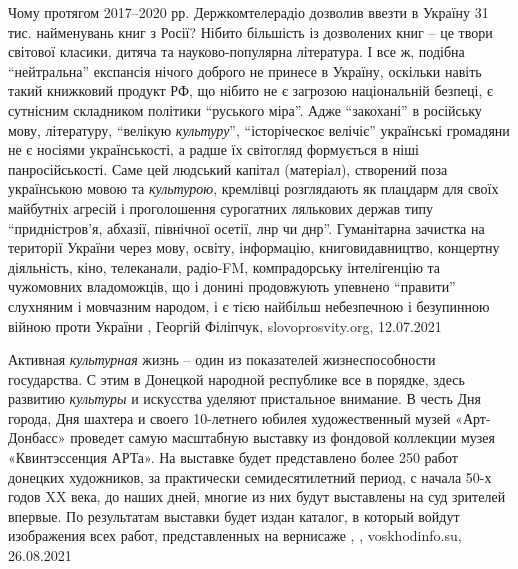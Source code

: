 Чому протягом 2017–2020 рр. Держкомтелерадіо дозволив ввезти в Україну 31 тис.
найменувань книг з Росії? Нібито більшість із дозволених книг – це твори
світової класики, дитяча та науково-популярна література. І все ж, подібна
\enquote{нейтральна} експансія нічого доброго не принесе в Україну, оскільки навіть
такий книжковий продукт РФ, що нібито не є загрозою національній безпеці, є
сутнісним складником політики \enquote{руського міра}. Адже \enquote{закохані} в російську
мову, літературу, \enquote{велікую \emph{культуру}}, \enquote{історіческоє велічіє} українські
громадяни не є носіями українськості, а радше їх світогляд формується в ніші
панросійськості. Саме цей людський капітал (матеріал), створений поза
українською мовою та \emph{культурою}, кремлівці розглядають як плацдарм для своїх
майбутніх агресій і проголошення сурогатних лялькових держав типу
\enquote{придністров’я, абхазії, північної осетії, лнр чи днр}. Гуманітарна зачистка на
території України через мову, освіту, інформацію, книговидавництво, концертну
діяльність, кіно, телеканали, радіо-FM, компрадорську інтелігенцію та
чужомовних владоможців, що і донині продовжують упевнено \enquote{правити} слухняним і
мовчазним народом, і є тією найбільш небезпечною і безупинною війною проти
України
, Георгій Філіпчук, slovoprosvity.org, 12.07.2021

Активная \emph{культурная} жизнь – один из показателей жизнеспособности
государства. С этим в Донецкой народной республике все в порядке, здесь
развитию \emph{культуры} и искусства уделяют пристальное внимание.  В честь Дня
города, Дня шахтера и своего 10-летнего юбилея художественный музей
«Арт-Донбасс» проведет самую масштабную выставку из фондовой коллекции музея
«Квинтэссенция АРТа».  На выставке будет представлено более 250 работ донецких
художников, за практически семидесятилетний период, с начала 50-х годов XX
века, до наших дней, многие из них будут выставлены на суд зрителей впервые. По
результатам выставки будет издан каталог, в который войдут изображения всех
работ, представленных на вернисаже
, , voskhodinfo.su, 26.08.2021
